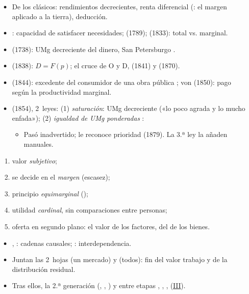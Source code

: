 \documentclass{article}
\begin{document}
\begin{columnas}
\begin{itemize}
\item De los clásicos: rendimientos decrecientes, renta diferencial (: el margen aplicado a la tierra), deducción.
\item {}: capacidad de satisfacer necesidades;  (1789);  (1833): total vs. marginal.
\item {} (1738): UMg decreciente del dinero, San Petersburgo .
\item {} (1838): $D=F(p)$; el cruce de O y D,  (1841) y  (1870).
\item {} (1844): excedente del consumidor de una obra pública ; von  (1850): pago según la productividad marginal.
\item {} (1854), 2~leyes: (1) \emph{saturación}: UMg decreciente («lo poco agrada y lo mucho enfada»); (2) \emph{igualdad de UMg ponderadas} :
  \begin{itemize}
  \item Pasó inadvertido;  le reconoce prioridad (1879). La 3.ª ley la añaden manuales.
  \end{itemize}
\end{itemize}
\begin{enumerate}
\item valor \emph{subjetivo};
\item se decide en el \emph{margen} (escasez);
\item principio \emph{equimarginal} ();
\item utilidad \emph{cardinal}, sin comparaciones entre personas;
\item oferta en segundo plano: el valor de los factores, del de los bienes.
\end{enumerate}
\begin{itemize}
\item {}, : cadenas causales; : interdependencia.
\item Juntan las 2~hojas  (un mercado) y  (todos): fin del valor trabajo y de la distribución residual.
\item Tras ellos, la 2.ª generación (, , ) y entre etapas , , ,  (\hyperref[rep:III]{III}).
\end{itemize}


\end{columnas}
\end{document}
